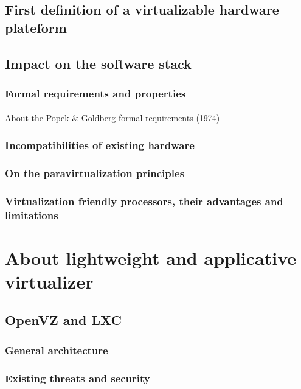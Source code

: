 \subsection{First definition of a virtualizable hardware plateform}

\subsection{Impact on the software stack}

\subsubsection{Formal requirements and properties}

\paragraph{}
About the Popek \& Goldberg formal requirements (1974)

\subsubsection{Incompatibilities of existing hardware}

\subsubsection{On the paravirtualization principles}

\subsubsection{Virtualization friendly processors, their advantages and limitations}

\section{About lightweight and applicative virtualizer}

\subsection{OpenVZ and LXC}

\subsubsection{General architecture}

\subsubsection{Existing threats and security}


